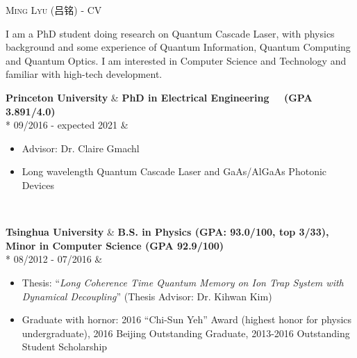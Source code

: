 \documentclass[localFont,alternative]{yaac-another-awesome-cv}
\begin{document}
 
\makecvheader 
\makecvfooter{\textsc{\today}} %
		{\textsc{Ming Lyu (吕铭) - CV}}
		{\thepage}
\par{
	I am a PhD student doing research on Quantum Cascade Laser, with physics
	background and some experience of Quantum Information, Quantum Computing 
	and Quantum Optics. I am interested in Computer Science and Technology
	and familiar with high-tech development. 
}


\newcommand\scholarshipentry[4]{
   \textbf{#1} & \textbf{#2} \\*
   #3          & \begin{minipage}[t]{\rightcolumnlength}
                     #4
                 \end{minipage}	\\}

\begin{experience}
	\scholarshipentry{Princeton University}{PhD in Electrical Engineering 
	~~(GPA 3.891/4.0)}
	{09/2016 - expected 2021}{
		\begin{itemize}
			\item Advisor: Dr. Claire Gmachl
			\item Long wavelength Quantum Cascade Laser and GaAs/AlGaAs Photonic Devices
		\end{itemize}
	}
	\emptySeparator
	\scholarshipentry{Tsinghua University}{B.S. in Physics (GPA: 93.0/100, top 3/33), Minor in Computer Science (GPA 92.9/100)}
	{08/2012 - 07/2016}{
		\begin{itemize}
			\item Thesis: ``\emph{Long Coherence Time Quantum Memory on 
				Ion Trap System with Dynamical Decoupling}''
				(Thesis Advisor: Dr. Kihwan Kim)
			\item Graduate with hornor: 2016 ``Chi-Sun Yeh'' Award 
			(highest honor for physics undergraduate),
				2016 Beijing Outstanding Graduate, 
				2013-2016 Outstanding Student Scholarship
		\end{itemize} 
	}
\end{experience}
\end{document}

